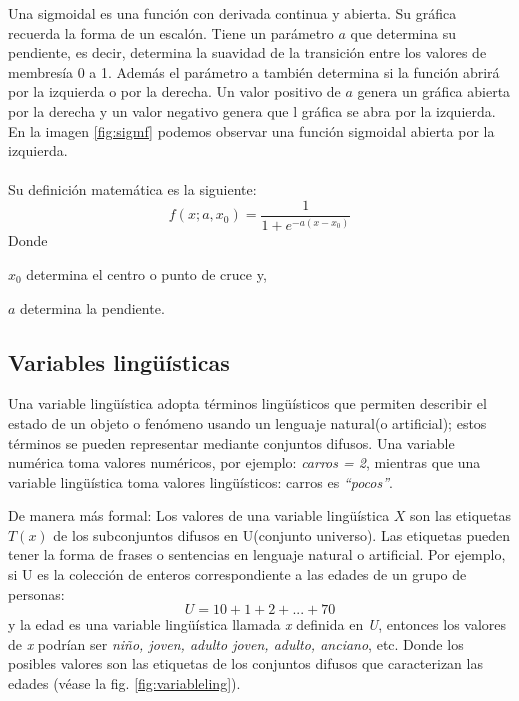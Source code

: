 Una sigmoidal es una función con derivada continua y abierta. Su gráfica recuerda la forma de un escalón. Tiene un parámetro $a$ que determina su pendiente, es decir, determina la suavidad de la transición entre los valores de membresía 0 a 1. Además el parámetro a también determina si la función abrirá por la izquierda o por la derecha. Un valor positivo de $a$ genera un gráfica abierta por la derecha
y un valor negativo genera que l gráfica se abra por la izquierda.
En la imagen \ref{fig:sigmf} podemos observar una función sigmoidal abierta por la izquierda.\\\\
Su definición matemática es la siguiente:
\begin{displaymath}
	f(x;a,x_0) = \frac{1}{1+e^{-a(x-x_0)}}
\end{displaymath}
Donde
{\setlength{\baselineskip}{0.7\baselineskip}\begin{description}
	\item $x_0$ determina el centro o punto de cruce y,
	\item $a$ determina la pendiente.
\end{description}}

\subsection{Variables lingüísticas}
Una variable lingüística adopta términos lingüísticos que permiten describir el estado de un objeto o fenómeno usando un lenguaje natural(o artificial); estos términos se pueden representar mediante conjuntos difusos. Una variable numérica toma valores numéricos, por ejemplo: \textit{carros = 2}, mientras que una variable lingüística toma valores lingüísticos: carros es \textit{``pocos''}.

De manera más formal: Los valores de una variable lingüística $X$ son las etiquetas $T(x)$ de los subconjuntos difusos en U(conjunto universo). Las etiquetas pueden tener la forma de frases o sentencias en lenguaje natural o artificial. Por ejemplo, si U es la colección de enteros correspondiente a las edades de un grupo de personas:
$$U = 10 + 1 + 2 + ... + 70$$
y la edad es una variable lingüística llamada \textit{x} definida en \textit{U}, entonces los valores de \textit{x} podrían ser \textit{niño, joven, adulto joven, adulto, anciano}, etc. Donde los posibles valores son las etiquetas de los conjuntos difusos que caracterizan las edades (véase la fig. \ref{fig:variableling}).

